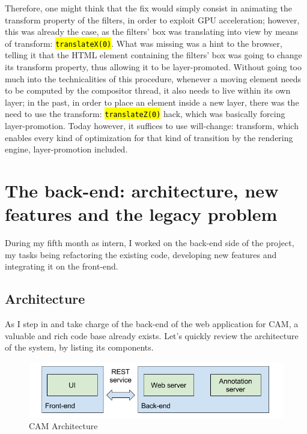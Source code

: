 \documentclass[12pt,svgnames]{memoir}
\let\OldTexttt\texttt
\renewcommand{\texttt}[1]{\OldTexttt{\hl{#1}}}
\begin{document}
Therefore, one might think that the fix would simply consist in
animating the transform property of the filters, in order to exploit GPU
acceleration; however, this was already the case, as the filters' box
was translating into view by means of transform: \texttt{translateX(0)}.
What was missing was a hint to the browser, telling it that the HTML
element containing the filters' box was going to change its transform
property, thus allowing it to be layer-promoted. Without going too much
into the technicalities of this procedure, whenever a moving element
needs to be computed by the compositor thread, it also needs to live
within its own layer; in the past, in order to place an element inside a
new layer, there was the need to use the transform:
\texttt{translateZ(0)} hack, which was basically forcing
layer-promotion. Today however, it suffices to use will-change:
transform, which enables every kind of optimization for that kind of
transition by the rendering engine, layer-promotion included.

\chapter{The back-end: architecture, new features and the legacy
problem}\label{the-back-end-architecture-new-features-and-the-legacy-problem}

During my fifth month as intern, I worked on the back-end side of the
project, my tasks being refactoring the existing code, developing new
features and integrating it on the front-end.

\section{Architecture}\label{architecture}

As I step in and take charge of the back-end of the web application for
CAM, a valuable and rich code base already exists. Let's quickly review
the architecture of the system, by listing its components.

\begin{figure}[htbp]
\centering
\includegraphics{./src/img/architecture.png}
\caption{CAM Architecture}
\end{figure}
\end{document}
